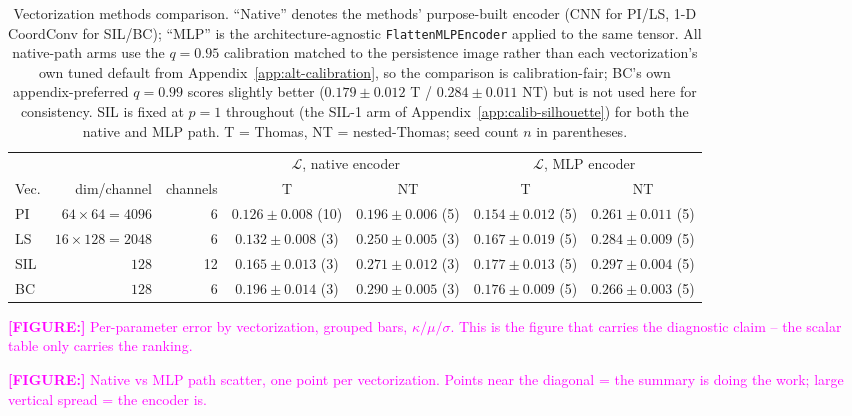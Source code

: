 \documentclass[11pt,letterpaper]{article}
\newcommand{\1}{\mathds{1}}
\newcommand{\fig}[1]{\textcolor{magenta}{\textbf{[FIGURE:] }#1}}
\theoremstyle{plain}
\theoremstyle{definitioncolon}
\begin{document}
\begin{table}[tbp]
\centering
\footnotesize
\begin{tabular}{lrrcccc}
\toprule
 & & & \multicolumn{2}{c}{$\mathcal{L}$, native encoder} & \multicolumn{2}{c}{$\mathcal{L}$, MLP encoder} \\
\cmidrule(lr){4-5}\cmidrule(lr){6-7}
Vec. & dim/channel & channels & T & NT & T & NT \\
\midrule
PI  & $64\times64=4096$ & 6  & $0.126 \pm 0.008$ (10) & $0.196 \pm 0.006$ (5) & $0.154 \pm 0.012$ (5) & $0.261 \pm 0.011$ (5) \\
LS  & $16\times128=2048$ & 6  & $0.132 \pm 0.008$ (3)  & $0.250 \pm 0.005$ (3) & $0.167 \pm 0.019$ (5) & $0.284 \pm 0.009$ (5) \\
SIL & $128$              & 12 & $0.165 \pm 0.013$ (3)  & $0.271 \pm 0.012$ (3) & $0.177 \pm 0.013$ (5) & $0.297 \pm 0.004$ (5) \\
BC  & $128$              & 6  & $0.196 \pm 0.014$ (3)  & $0.290 \pm 0.005$ (3) & $0.176 \pm 0.009$ (5) & $0.266 \pm 0.003$ (5) \\
\bottomrule
\end{tabular}
\caption{Vectorization methods comparison. ``Native'' denotes the methods'
purpose-built encoder (CNN for PI/LS, 1-D CoordConv for SIL/BC); ``MLP'' is
the architecture-agnostic \texttt{FlattenMLPEncoder} applied to the same
tensor. All native-path arms use the $q=0.95$ calibration matched to the
persistence image rather than each
vectorization's own tuned default from Appendix~\ref{app:alt-calibration},
so the comparison is calibration-fair;
BC's own appendix-preferred $q=0.99$ scores slightly better
($0.179\pm0.012$ T / $0.284\pm0.011$ NT) but is not used here for
consistency. SIL is fixed at $p=1$ throughout (the SIL-1 arm of
Appendix~\ref{app:calib-silhouette}) for both the native and MLP path. T =
Thomas, NT = nested-Thomas; seed count $n$ in parentheses.}
\label{tab:main-comparison}
\end{table}
\fig{Per-parameter error by vectorization, grouped bars, $\kappa/\mu/\sigma$.
This is the figure that carries the diagnostic claim -- the scalar table only
carries the ranking.}

\fig{Native vs MLP path scatter, one point per vectorization. Points near the
diagonal = the summary is doing the work; large vertical spread = the encoder is.}
\end{document}
